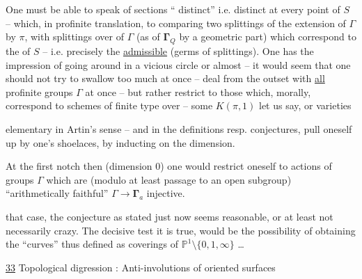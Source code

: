 

One must be able to speak of sections `` distinct'' i.e. distinct at every point of $S$ -- which, in profinite translation,  to comparing two splittings of the extension of $\Gamma$ by $\pi$, with   splittings over  of $\Gamma$ (as  of $\boldsymbol{\Gamma}_Q$ by a geometric part) which correspond to the  of $S$ -- i.e. precisely the \uline{admissible} (germs of splittings). One has the impression of going around in a vicious circle or almost -- it would seem that one should not try to swallow too much at once -- deal from the outset with \uline{all} profinite groups $\Gamma$ at once -- but rather restrict   to those which, morally, correspond to  schemes of finite type over  -- some $K(\pi,1)$ let us say, or  varieties


elementary in Artin's sense -- and in the definitions resp. conjectures, pull oneself up by one's shoelaces, by inducting on the dimension.

At the first notch then (dimension $0$) one would restrict oneself to actions of groups $\Gamma$ which are (modulo at least passage to an open subgroup) ``arithmetically faithful''  $\Gamma\to\boldsymbol{\Gamma}_a$ injective.

 that case, the conjecture as stated just now seems reasonable, or at least not necessarily crazy. The decisive test\unsure{,|,:} it is true, would be the possibility of obtaining the ``curves'' thus defined as coverings of $\mathbb{P}^1\setminus\{0,1,\infty\}$ \ldots


\uline{33} Topological digression :
Anti-involutions of oriented  surfaces


